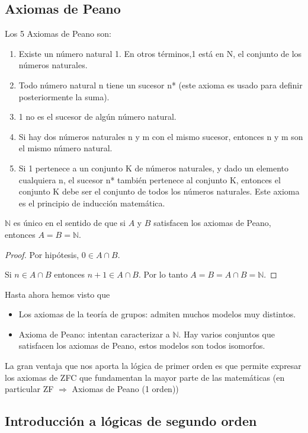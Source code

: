 \subsection{Axiomas de Peano}
	Los 5 Axiomas de Peano son:
	\begin{enumerate}
		\item Existe un número natural 1. En otros términos,1 está en N, el conjunto de los números naturales.
		\item Todo número natural n tiene un sucesor n* (este axioma es usado para definir posteriormente la suma).
		\item 1 no es el sucesor de algún número natural.
		\item Si hay dos números naturales n y m con el mismo sucesor, entonces n y m son el mismo número natural.
		\item Si 1 pertenece a un conjunto K de números naturales, y dado un elemento cualquiera n, el sucesor n* también pertenece al conjunto K, entonces el conjunto K debe ser el conjunto de todos los números naturales. Este axioma es el principio de inducción matemática.
	\end{enumerate}

	\begin{theorem}
		$\mathbb{N}$ es único en el sentido de que si $A$ y $B$ satisfacen los axiomas de Peano, entonces $A=B=\mathbb{N}$. 
	\end{theorem}
	\begin{proof}
		Por hipótesis, $0\in A\cap B$.

		Si $n\in A\cap B$ entonces $n+1\in A\cap B$. Por lo tanto $A=B=A\cap B=\mathbb{N}$.
	\end{proof}
	
	Hasta ahora hemos visto que
	\begin{itemize}
		\item Los axiomas de la teoría de grupos: admiten muchos modelos muy distintos.
		\item Axioma de Peano: intentan caracterizar a $\mathbb{N}$. Hay varios conjuntos que satisfacen los axiomas de Peano, estos modelos son todos isomorfos.
	\end{itemize}

La gran ventaja que nos aporta la lógica de primer orden es que permite expresar los axiomas de ZFC que fundamentan la mayor parte de las matemáticas (en particular ZF $\Rightarrow$ Axiomas de Peano (1 orden))

\subsection{Introducción a lógicas de segundo orden}

